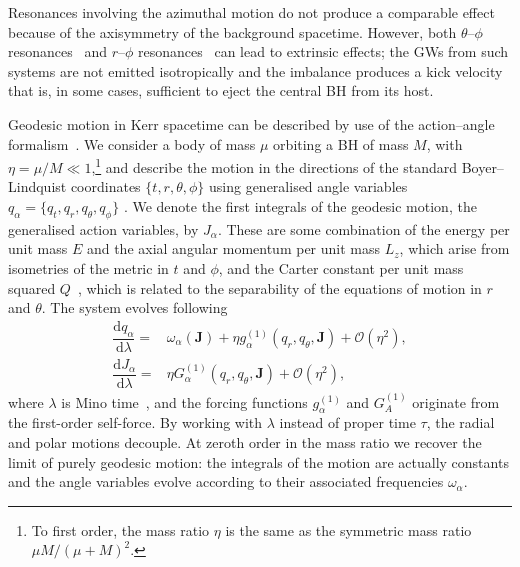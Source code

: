 \documentclass[aps,prd,amsfonts,amssymb,amsmath,nofootinbib,showpacs,superscriptaddress,twocolumn]{revtex4}
\newcommand{\dd}{\ensuremath{\mathrm{d}}}
\newcommand{\diff}[2]{\ensuremath{\dfrac{\dd {#1}}{\dd {#2}}}}
\newcommand{\order}[1]{\ensuremath{\mathcal{O}({#1})}}
\begin{document}
Resonances involving the azimuthal motion do not produce a comparable effect because of the axisymmetry of the background spacetime. However, both $\theta$--$\phi$ resonances~\cite{Hirata2011} and $r$--$\phi$ resonances~\cite{VanDeMeent2013} can lead to extrinsic effects; the GWs from such systems are not emitted isotropically and the imbalance produces a kick velocity that is, in some cases, sufficient to eject the central BH from its host.

Geodesic motion in Kerr spacetime can be described by use of the action--angle formalism~\cite{Goldstein2002}. %
We consider a body of mass $\mu$ orbiting a BH of mass $M$, with $\eta = \mu/M \ll 1$,\footnote{To first order, the mass ratio $\eta$ is the same as the symmetric mass ratio $\mu M/(\mu+M)^2$.} and describe the motion in the directions of the standard Boyer--Lindquist coordinates $\{t,r,\theta,\phi\}$ using generalised angle variables $q_\alpha = \{q_t,q_r,q_\theta,q_\phi\}$ \citep{Hinderer2008}. We denote the first integrals of the geodesic motion, the generalised action variables, by $J_\alpha$. These are some combination of the energy per unit mass $E$ and the axial angular momentum per unit mass $L_z$, which arise from isometries of the metric in $t$ and $\phi$, and the Carter constant per unit mass squared $Q$~\cite{Carter1968}, which is related to the separability of the equations of motion in $r$ and $\theta$. The system evolves following~\cite{Flanagan2012}
\begin{subequations}
\label{eq:Mino-E-o-M}
\begin{align}
\diff{q_\alpha}{\lambda} = {} & \omega_\alpha(\boldsymbol{J}) + \eta g_\alpha^{(1)}(q_r,q_\theta,\boldsymbol{J}) + \order{\eta^2}, \\
\diff{J_\alpha}{\lambda} = {} & \eta G_\alpha^{(1)}(q_r,q_\theta,\boldsymbol{J}) + \order{\eta^2},
\end{align}
\end{subequations}
where $\lambda$ is Mino time~\cite{Mino2003}, and the forcing functions $g_\alpha^{(1)}$ and $G_A^{(1)}$ originate from the first-order self-force. By working with $\lambda$ instead of proper time $\tau$, the radial and polar motions decouple. At zeroth order in the mass ratio we recover the limit of purely geodesic motion: the integrals of the motion are actually constants and the angle variables evolve according to their associated frequencies $\omega_\alpha$.
\end{document}
